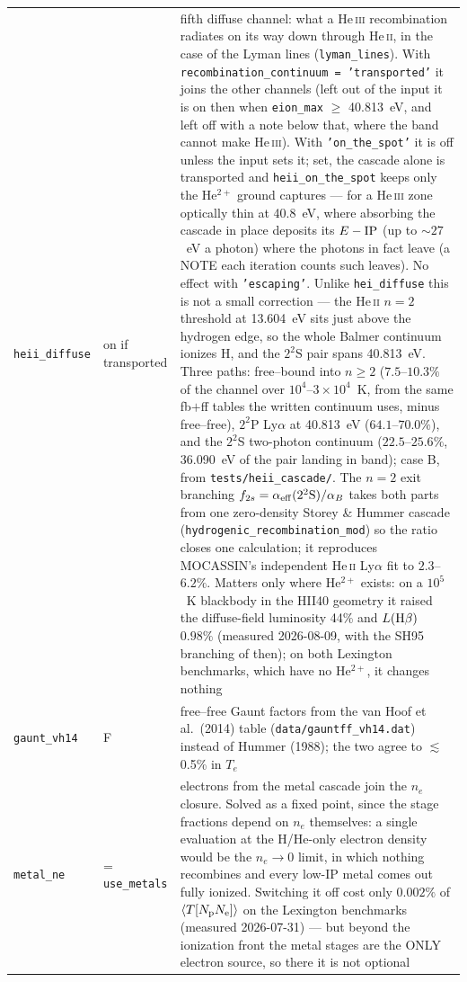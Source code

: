 \documentclass[english,a4paper]{my_memo}
\newcommand{\code}[1]{\texttt{#1}}
\begin{document}
{\begin{longtable}{llp{7.2cm}}
\code{heii\_diffuse} & on if transported & fifth diffuse channel: what a He\,\textsc{iii} recombination radiates on its way down through He\,\textsc{ii}, in the case of the Lyman lines (\code{lyman\_lines}).  With \code{recombination\_continuum = 'transported'} it joins the other channels (left out of the input it is on then when \code{eion\_max} $\ge$ 40.813~eV, and left off with a note below that, where the band cannot make He\,\textsc{iii}).  With \code{'on\_the\_spot'} it is off unless the input sets it; set, the cascade alone is transported and \code{heii\_on\_the\_spot} keeps only the He$^{2+}$ ground captures --- for a He\,\textsc{iii} zone optically thin at 40.8~eV, where absorbing the cascade in place deposits its $E - {\rm IP}$ (up to $\sim27$~eV a photon) where the photons in fact leave (a NOTE each iteration counts such leaves).  No effect with \code{'escaping'}.  Unlike \code{hei\_diffuse} this is not a small correction --- the He\,\textsc{ii} $n=2$ threshold at 13.604~eV sits just above the hydrogen edge, so the whole Balmer continuum ionizes H, and the $2^2$S pair spans 40.813~eV.  Three paths: free--bound into $n\ge2$ ($7.5$--$10.3\%$ of the channel over $10^4$--$3{\times}10^4$~K, from the same fb$+$ff tables the written continuum uses, minus free--free), $2^2$P Ly$\alpha$ at 40.813~eV ($64.1$--$70.0\%$), and the $2^2$S two-photon continuum ($22.5$--$25.6\%$, 36.090~eV of the pair landing in band); case B, from \code{tests/heii\_cascade/}.  The $n=2$ exit branching $f_{2s}=\alpha_{\rm eff}(2^2{\rm S})/\alpha_B$ takes both parts from one zero-density Storey \& Hummer cascade (\code{hydrogenic\_recombination\_mod}) so the ratio closes one calculation; it reproduces MOCASSIN's independent He\,\textsc{ii} Ly$\alpha$ fit to $2.3$--$6.2\%$.  Matters only where He$^{2+}$ exists: on a $10^5$~K blackbody in the HII40 geometry it raised the diffuse-field luminosity 44\% and $L({\rm H}\beta)$ $0.98\%$ (measured 2026-08-09, with the SH95 branching of then); on both Lexington benchmarks, which have no He$^{2+}$, it changes nothing \\
\code{gaunt\_vh14} & F & free--free Gaunt factors from the van Hoof et al.\ (2014) table (\code{data/gauntff\_vh14.dat}) instead of Hummer (1988); the two agree to $\lesssim$0.5\% in $T_e$ \\
\code{metal\_ne} & = \code{use\_metals} & electrons from the metal cascade join the $n_e$ closure.  Solved as a fixed point, since the stage fractions depend on $n_e$ themselves: a single evaluation at the H/He-only electron density would be the $n_e\to0$ limit, in which nothing recombines and every low-IP metal comes out fully ionized.  Switching it off cost only $0.002\%$ of $\langle T[N_{\rm p}N_{\rm e}]\rangle$ on the Lexington benchmarks (measured 2026-07-31) --- but beyond the ionization front the metal stages are the ONLY electron source, so there it is not optional \\

\end{longtable}}
\end{document}
